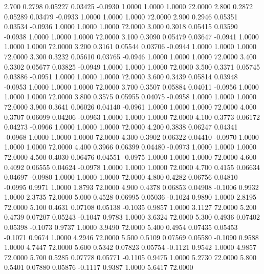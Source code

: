    2.700   0.2798   0.05227   0.03425  -0.0930   1.0000   1.0000   1.0000  72.0000
   2.800   0.2872   0.05289   0.03479  -0.0933   1.0000   1.0000   1.0000  72.0000
   2.900   0.2946   0.05351   0.03534  -0.0936   1.0000   1.0000   1.0000  72.0000
   3.000   0.3018   0.05415   0.03590  -0.0938   1.0000   1.0000   1.0000  72.0000
   3.100   0.3090   0.05479   0.03647  -0.0941   1.0000   1.0000   1.0000  72.0000
   3.200   0.3161   0.05544   0.03706  -0.0944   1.0000   1.0000   1.0000  72.0000
   3.300   0.3232   0.05610   0.03765  -0.0946   1.0000   1.0000   1.0000  72.0000
   3.400   0.3302   0.05677   0.03825  -0.0949   1.0000   1.0000   1.0000  72.0000
   3.500   0.3371   0.05745   0.03886  -0.0951   1.0000   1.0000   1.0000  72.0000
   3.600   0.3439   0.05814   0.03948  -0.0953   1.0000   1.0000   1.0000  72.0000
   3.700   0.3507   0.05884   0.04011  -0.0956   1.0000   1.0000   1.0000  72.0000
   3.800   0.3575   0.05955   0.04075  -0.0958   1.0000   1.0000   1.0000  72.0000
   3.900   0.3641   0.06026   0.04140  -0.0961   1.0000   1.0000   1.0000  72.0000
   4.000   0.3707   0.06099   0.04206  -0.0963   1.0000   1.0000   1.0000  72.0000
   4.100   0.3773   0.06172   0.04273  -0.0966   1.0000   1.0000   1.0000  72.0000
   4.200   0.3838   0.06247   0.04341  -0.0968   1.0000   1.0000   1.0000  72.0000
   4.300   0.3902   0.06322   0.04410  -0.0970   1.0000   1.0000   1.0000  72.0000
   4.400   0.3966   0.06399   0.04480  -0.0973   1.0000   1.0000   1.0000  72.0000
   4.500   0.4030   0.06476   0.04551  -0.0975   1.0000   1.0000   1.0000  72.0000
   4.600   0.4092   0.06555   0.04624  -0.0978   1.0000   1.0000   1.0000  72.0000
   4.700   0.4155   0.06634   0.04697  -0.0980   1.0000   1.0000   1.0000  72.0000
   4.800   0.4282   0.06756   0.04810  -0.0995   0.9971   1.0000   1.8793  72.0000
   4.900   0.4378   0.06853   0.04908  -0.1006   0.9932   1.0000   2.3735  72.0000
   5.000   0.4528   0.06995   0.05036  -0.1024   0.9890   1.0000   2.8195  72.0000
   5.100   0.4631   0.07108   0.05138  -0.1035   0.9857   1.0000   3.1127  72.0000
   5.200   0.4739   0.07207   0.05243  -0.1047   0.9783   1.0000   3.6324  72.0000
   5.300   0.4936   0.07402   0.05398  -0.1073   0.9737   1.0000   3.9490  72.0000
   5.400   0.4954   0.07435   0.05453  -0.1071   0.9674   1.0000   4.2946  72.0000
   5.500   0.5109   0.07569   0.05580  -0.1090   0.9588   1.0000   4.7447  72.0000
   5.600   0.5342   0.07823   0.05754  -0.1121   0.9542   1.0000   4.9857  72.0000
   5.700   0.5285   0.07778   0.05771  -0.1105   0.9475   1.0000   5.2730  72.0000
   5.800   0.5401   0.07880   0.05876  -0.1117   0.9387   1.0000   5.6417  72.0000
